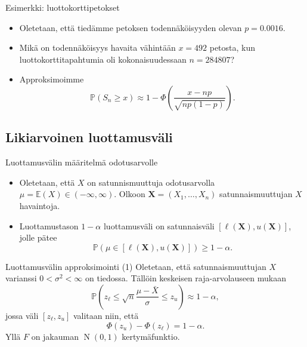 \documentclass{beamer}
\DeclareMathOperator{\n}{\mathrm N}
\begin{document}
\begin{frame}{Esimerkki: luottokorttipetokset}
  \begin{itemize}
    \item Oletetaan, että tiedämme petoksen todennäköisyyden olevan $p =
    0.0016$.
    \item Mikä on todennäköisyys havaita vähintään $x = 492$ petosta, kun
    luottokorttitapahtumia oli kokonaisuudessaan $n = 284807$?
    \item Approksimoimme
    \begin{equation*}
      \mathbb{P}\left(S_n \geq x\right) \approx 1 - \Phi\left(\frac{x - np}
      {\sqrt{np(1-p)}}\right).
    \end{equation*}
  \end{itemize}
  
\end{frame}


\subsection{Likiarvoinen luottamusväli}


\begin{frame}{Luottamusvälin määritelmä odotusarvolle}
  \begin{itemize}
    \item Oletetaan, että $X$ on satunnismuuttuja odotusarvolla $\mu =
    \mathbb{E}\left(X\right)\in(-\infty, \infty)$. Olkoon $\bm X = (X_1, \ldots,
    X_n)$ satunnaismuuttujan $X$ havaintoja.
    \pause
    \item Luottamustason $1-\alpha$ luottamusväli on satunnaisväli
    $\left[\ell\left(\bm X\right), u\left(\bm X\right)\right]$, jolle pätee
    \begin{equation*}
      \mathbb{P}\left(\mu\in\left[\ell\left(\bm X\right), u\left(\bm
      X\right)\right]\right) \geq 1 - \alpha.
    \end{equation*}
  \end{itemize}
\end{frame}


\begin{frame}{Luottamusvälin approksimointi (1)}
  Oletetaan, että satunnaismuuttujan $X$ varianssi $0 < \sigma^2 < \infty$ on
  tiedossa. Tällöin keskeisen raja-arvolauseen mukaan
  \begin{equation*}
    \mathbb{P}\left(z_{\ell} \leq \sqrt{n}\frac{\mu - \bar X}{\sigma}
    \leq z_u\right) \approx 1 - \alpha,
  \end{equation*}
  \pause
  jossa väli $[z_\ell, z_u]$ valitaan niin, että
  \begin{equation*}
    \Phi(z_u) - \Phi(z_\ell) = 1-\alpha.
  \end{equation*}
  Yllä $F$ on jakauman $\n\left(0,1\right)$ kertymäfunktio.
\end{frame}
\end{document}
